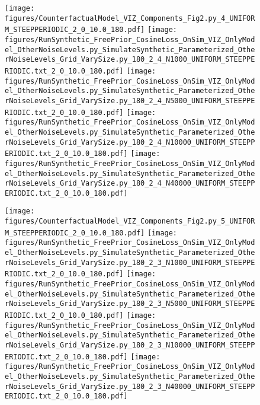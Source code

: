 \documentclass{article}
\begin{document}
\begin{figure}
\texttt{[image: figures/CounterfactualModel\_VIZ\_Components\_Fig2.py\_4\_UNIFORM\_STEEPPERIODIC\_2\_0\_10.0\_180.pdf]}
\texttt{[image: figures/RunSynthetic\_FreePrior\_CosineLoss\_OnSim\_VIZ\_OnlyModel\_OtherNoiseLevels.py\_SimulateSynthetic\_Parameterized\_OtherNoiseLevels\_Grid\_VarySize.py\_180\_2\_4\_N1000\_UNIFORM\_STEEPPERIODIC.txt\_2\_0\_10.0\_180.pdf]}
\texttt{[image: figures/RunSynthetic\_FreePrior\_CosineLoss\_OnSim\_VIZ\_OnlyModel\_OtherNoiseLevels.py\_SimulateSynthetic\_Parameterized\_OtherNoiseLevels\_Grid\_VarySize.py\_180\_2\_4\_N5000\_UNIFORM\_STEEPPERIODIC.txt\_2\_0\_10.0\_180.pdf]}
\texttt{[image: figures/RunSynthetic\_FreePrior\_CosineLoss\_OnSim\_VIZ\_OnlyModel\_OtherNoiseLevels.py\_SimulateSynthetic\_Parameterized\_OtherNoiseLevels\_Grid\_VarySize.py\_180\_2\_4\_N10000\_UNIFORM\_STEEPPERIODIC.txt\_2\_0\_10.0\_180.pdf]}
\texttt{[image: figures/RunSynthetic\_FreePrior\_CosineLoss\_OnSim\_VIZ\_OnlyModel\_OtherNoiseLevels.py\_SimulateSynthetic\_Parameterized\_OtherNoiseLevels\_Grid\_VarySize.py\_180\_2\_4\_N40000\_UNIFORM\_STEEPPERIODIC.txt\_2\_0\_10.0\_180.pdf]}


\texttt{[image: figures/CounterfactualModel\_VIZ\_Components\_Fig2.py\_5\_UNIFORM\_STEEPPERIODIC\_2\_0\_10.0\_180.pdf]}
\texttt{[image: figures/RunSynthetic\_FreePrior\_CosineLoss\_OnSim\_VIZ\_OnlyModel\_OtherNoiseLevels.py\_SimulateSynthetic\_Parameterized\_OtherNoiseLevels\_Grid\_VarySize.py\_180\_2\_3\_N1000\_UNIFORM\_STEEPPERIODIC.txt\_2\_0\_10.0\_180.pdf]}
\texttt{[image: figures/RunSynthetic\_FreePrior\_CosineLoss\_OnSim\_VIZ\_OnlyModel\_OtherNoiseLevels.py\_SimulateSynthetic\_Parameterized\_OtherNoiseLevels\_Grid\_VarySize.py\_180\_2\_3\_N5000\_UNIFORM\_STEEPPERIODIC.txt\_2\_0\_10.0\_180.pdf]}
\texttt{[image: figures/RunSynthetic\_FreePrior\_CosineLoss\_OnSim\_VIZ\_OnlyModel\_OtherNoiseLevels.py\_SimulateSynthetic\_Parameterized\_OtherNoiseLevels\_Grid\_VarySize.py\_180\_2\_3\_N10000\_UNIFORM\_STEEPPERIODIC.txt\_2\_0\_10.0\_180.pdf]}
\texttt{[image: figures/RunSynthetic\_FreePrior\_CosineLoss\_OnSim\_VIZ\_OnlyModel\_OtherNoiseLevels.py\_SimulateSynthetic\_Parameterized\_OtherNoiseLevels\_Grid\_VarySize.py\_180\_2\_3\_N40000\_UNIFORM\_STEEPPERIODIC.txt\_2\_0\_10.0\_180.pdf]}



\end{figure}
\end{document}
